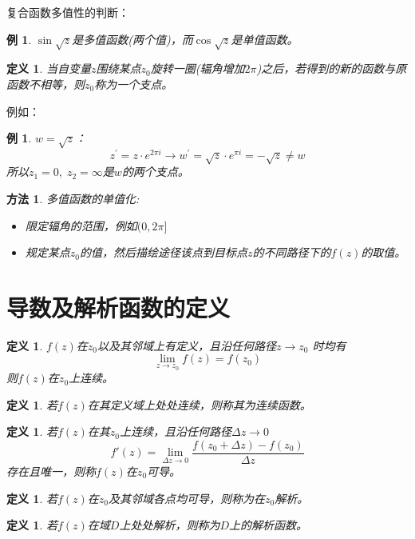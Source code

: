 \documentclass[10pt, a4paper, oneside]{ctexbook}
\newtheorem{definition}[theorem]{定义}
\newtheorem{example}[theorem]{例}
\newtheorem{method}[theorem]{方法}
\begin{document}
复合函数多值性的判断：
\begin{example}
    $\sin \sqrt{z}$是多值函数(两个值)，而$\cos \sqrt{z}$是单值函数。
\end{example}
\begin{definition}
    当自变量$z$围绕某点$z_0$旋转一圈(辐角增加$2\pi$)之后，若得到的新的函数与原函数不相等，则$z_0$称为一个支点。
\end{definition}
例如：
\begin{example}
    $w=\sqrt{z}$：
    $$z^\prime=z\cdot e^{2\pi i}\to w^\prime=\sqrt{z}\cdot e^{ \pi i} = - \sqrt{z} \ne w$$
    所以$z_1 = 0,\;z_2=\infty$是$w$的两个支点。
\end{example}

\begin{method}
    多值函数的单值化:
\begin{itemize}
    \item 限定辐角的范围，例如$(0,2\pi]$
    \item 规定某点$z_0$的值，然后描绘途径该点到目标点$z$的不同路径下的$f(z)$的取值。
\end{itemize}
\end{method}

\section{导数及解析函数的定义}
\begin{definition}
    $f(z)$在$z_0$以及其邻域上有定义，且沿任何路径$z\to z_0$
    时均有 $$\lim_{z\to z_0}f(z)=f(z_0)$$ 
    则$f(z)$在$z_0$上连续。
\end{definition}
\begin{definition}
    若$f(z)$在其定义域上处处连续，则称其为连续函数。
\end{definition}
\begin{definition}
    若$f(z)$在其$z_0$上连续，且沿任何路径$\Delta z \to 0$
    $$
    f' (z) =\lim_{\Delta z \to 0} \frac{f(z_0+\Delta z)-f(z_0)}{\Delta z}
    $$
    存在且唯一，则称$f(z)$在$z_0$可导。
\end{definition}
\begin{definition}
    若$f(z)$在$z_0$及其邻域各点均可导，则称为在$z_0$解析。
\end{definition}
\begin{definition}
    若$f(z)$在域$D$上处处解析，则称为$D$上的解析函数。
\end{definition}
\end{document}
